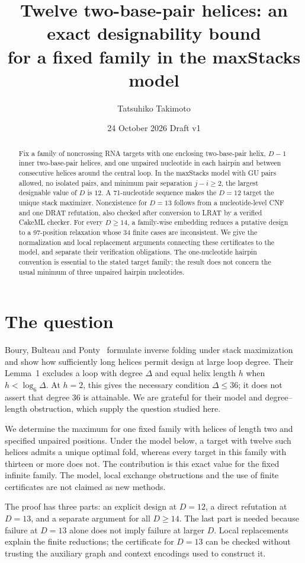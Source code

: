 \documentclass[11pt,a4paper]{article}
\title{Twelve two-base-pair helices: an exact designability bound\protect\\
for a fixed family in the maxStacks model}
\author{Tatsuhiko Takimoto}
\date{24 October 2026 \quad Draft v1}
\theoremstyle{definition}
\begin{document}
\maketitle
\begin{abstract}
Fix a family of noncrossing RNA targets with one enclosing two-base-pair
helix, $D-1$ inner two-base-pair helices, and one unpaired nucleotide in
each hairpin and between consecutive helices around the central loop.
In the maxStacks model with GU pairs allowed, no isolated pairs, and
minimum pair separation $j-i\geq2$, the largest designable value of $D$
is $12$. A 71-nucleotide sequence makes the $D=12$ target the unique
stack maximizer. Nonexistence for $D=13$ follows from a nucleotide-level
CNF and one DRAT refutation, also checked after conversion to LRAT
by a verified CakeML checker. For every $D\geq14$, a family-wise embedding
reduces a putative design to a 97-position relaxation whose 34 finite
cases are inconsistent. We give the normalization and local replacement
arguments connecting these certificates to the model, and separate
their verification obligations. The one-nucleotide hairpin convention
is essential to the stated target family; the result does not concern
the usual minimum of three unpaired hairpin nucleotides.
\end{abstract}

\section{The question}
Boury, Bulteau and Ponty~\cite{BBP} formulate inverse folding under stack
maximization and show how sufficiently long helices permit design at
large loop degree. Their Lemma~1 excludes a loop with degree $\Delta$
and equal helix length $h$ when $h<\log_6\Delta$. At $h=2$, this gives
the necessary condition $\Delta\leq36$; it does not assert that degree
$36$ is attainable. We are grateful for their model and degree--length
obstruction, which supply the question studied here.

We determine the maximum for one fixed family with helices of length
two and specified unpaired positions. Under the model below, a target
with twelve such helices admits a unique optimal fold, whereas every
target in this family with thirteen or more does not. The contribution
is this exact value for the fixed infinite family. The model, local
exchange obstructions and the use of finite certificates are not
claimed as new methods.

The proof has three parts: an explicit design at $D=12$, a direct
refutation at $D=13$, and a separate argument for all $D\geq14$.
The last part is needed because failure at $D=13$ alone does not imply
failure at larger $D$. Local replacements explain the finite reductions;
the certificate for $D=13$ can be checked without trusting the auxiliary
graph and context encodings used to construct it.
\end{document}
